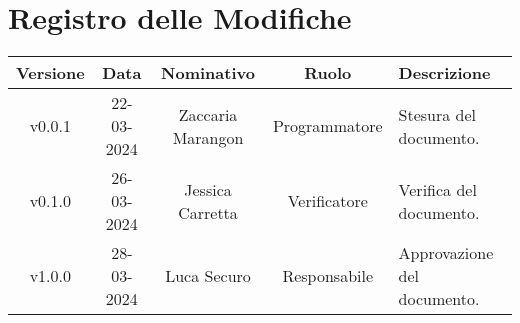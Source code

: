 \section*{\Large Registro delle Modifiche}
    \begin{table}[h]
        \centering
        \renewcommand\tabularxcolumn[1]{m{#1}} %
        \renewcommand{\arraystretch}{1.5}
        \begin{tabularx}{0.98\textwidth}
            {c|c|c|c|>{\centering\arraybackslash}X}
            \rowcolor{black}
            \textbf{\color{white} Versione} & \textbf{\color{white} Data} & \textbf{\color{white} Nominativo} & \textbf{\color{white} Ruolo} & \textbf{\color{white} Descrizione} \\ 
            \hline

            v0.0.1 & 22-03-2024 & Zaccaria Marangon & Programmatore & Stesura del documento.\\
            v0.1.0 & 26-03-2024 & Jessica Carretta & Verificatore & Verifica del documento.\\
            v1.0.0 & 28-03-2024 & Luca Securo & Responsabile & Approvazione del documento.\\
            
           
            \hline
        \end{tabularx}
    \end{table}
